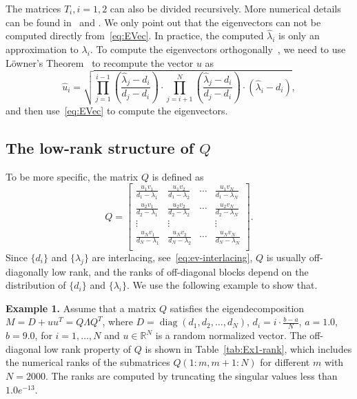 \documentclass[times]{nlaauth}
\newcommand{\diag}{\mathop{\mathrm{diag}}\nolimits}
\begin{document}
The matrices $T_i, i=1,2$ can also be divided recursively.
More numerical details can be found in~\cite{Rutter94} and \cite{Demmel-book}. We only point
out that the eigenvectors can not be computed directly from~\eqref{eq:EVec}.
In practice, the computed $\hat{\lambda}_i$ is only an approximation to $\lambda_i$.
To compute the eigenvectors orthogonally~\cite{Gu-eigenvalue,Gu-rank1},
we need to use L\"{o}wner's Theorem~\cite{lowner} to recompute the vector $u$ as
\begin{equation}
  \label{eq:ev_z}
  \hat{u}_i = \sqrt{\prod_{j=1}^{i-1}\left(\frac{\hat{\lambda}_j-d_i}{d_j-d_i}\right)\cdotp
    \prod_{j=i+1}^{N}\left(\frac{\hat{\lambda}_j-d_i}{d_{j}-d_i}\right) \cdotp (\hat{\lambda}_i-d_i)},
\end{equation}
and then use~\eqref{eq:EVec} to compute the eigenvectors.

\subsection{The low-rank structure of $Q$}
\label{sec:lowrank}

 To be more specific, the matrix $Q$ is defined as
 \begin{equation}
   \label{eq:Ev-Q}
   Q=
   \begin{bmatrix}
     \frac{u_1 v_1}{d_1 - \lambda_1} & \frac{u_1 v_2}{d_1-\lambda_2} & \cdots & \frac{u_1 v_N}{d_1-\lambda_N} \\
     \frac{u_2 v_1}{d_2 - \lambda_1} & \frac{u_2 v_2}{d_2-\lambda_2} & \cdots & \frac{u_2v_N}{d_2-\lambda_N} \\
     \vdots & \vdots & & \vdots \\
     \frac{u_N v_1}{d_N - \lambda_1} & \frac{u_N v_2}{d_N-\lambda_2} & \cdots & \frac{u_N v_N}{d_N-\lambda_N} \\
   \end{bmatrix}.
 \end{equation}
Since $\{d_i\}$ and $\{\lambda_j\}$ are interlacing, see~\eqref{eq:ev-interlacing}, $Q$ is usually
off-diagonally low rank, and the ranks of off-diagonal blocks depend on the distribution of $\{d_i\}$ and $\{\lambda_i\}$.
We use the following example to show that.

{\bf Example 1.}
Assume that a matrix $Q$ satisfies the eigendecomposition $M=D+uu^T=Q\Lambda Q^T$,
where $D=\diag(d_1,d_2,\ldots,d_N)$, $d_i=i\cdotp \frac{b-a}{N}$, $a=1.0$, $b=9.0$,
for $i=1,\ldots,N$ and
$u\in \mathbb{R}^N$ is a random normalized vector.
The off-diagonal low rank property of $Q$ is shown in Table~\ref{tab:Ex1-rank},
which includes the numerical ranks of the submatrices $Q(1:m,m+1:N)$ for different $m$ with $N=2000$.
The ranks are computed by truncating the singular values less than $1.0e^{-13}$.
\end{document}
